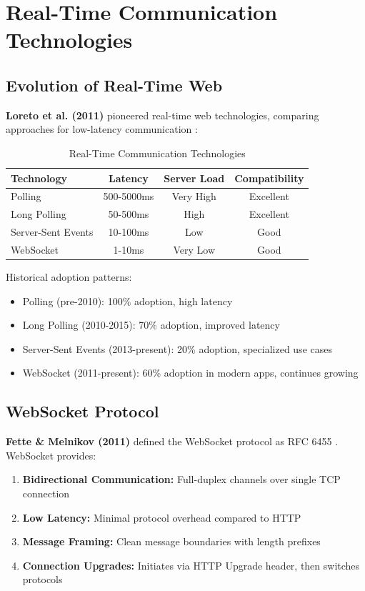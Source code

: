 \documentclass[conference]{IEEEtran}
\begin{document}
\section{Real-Time Communication Technologies}

\subsection{Evolution of Real-Time Web}

\textbf{Loreto et al. (2011)} pioneered real-time web technologies, comparing approaches for low-latency communication \cite{loreto2011real}:

\begin{table}[h]
\centering
\caption{Real-Time Communication Technologies}
\begin{tabular}{|l|c|c|c|}
\hline
\textbf{Technology} & \textbf{Latency} & \textbf{Server Load} & \textbf{Compatibility} \\
\hline
Polling & 500-5000ms & Very High & Excellent \\
Long Polling & 50-500ms & High & Excellent \\
Server-Sent Events & 10-100ms & Low & Good \\
WebSocket & 1-10ms & Very Low & Good \\
\hline
\end{tabular}
\end{table}

Historical adoption patterns:
\begin{itemize}
    \item Polling (pre-2010): 100\% adoption, high latency
    \item Long Polling (2010-2015): 70\% adoption, improved latency
    \item Server-Sent Events (2013-present): 20\% adoption, specialized use cases
    \item WebSocket (2011-present): 60\% adoption in modern apps, continues growing
\end{itemize}

\subsection{WebSocket Protocol}

\textbf{Fette \& Melnikov (2011)} defined the WebSocket protocol as RFC 6455 \cite{fette2011websocket}. WebSocket provides:

\begin{enumerate}
    \item \textbf{Bidirectional Communication:} Full-duplex channels over single TCP connection
    \item \textbf{Low Latency:} Minimal protocol overhead compared to HTTP
    \item \textbf{Message Framing:} Clean message boundaries with length prefixes
    \item \textbf{Connection Upgrades:} Initiates via HTTP Upgrade header, then switches protocols
\end{enumerate}
\end{document}
